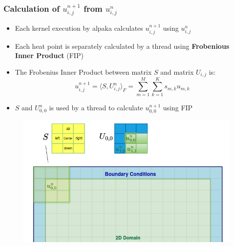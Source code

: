 \documentclass[9pt]{beamer}
\begin{document}
\begin{frame}
\frametitle{Calculation of $u_{i,j}^{n+1}$ from $u_{i,j}^{n}$}
\vspace{-0.1\baselineskip}
    \begin{itemize}
        \item Each kernel execution by alpaka calculates $u_{i,j}^{n+1}$ using $u_{i,j}^{n}$
        \item Each heat point is separately calculated by a thread using \textbf{Frobenious Inner Product} (FIP)
        \item The Frobenius Inner Product between matrix \( S \) and matrix \( U_{i,j} \) is:
\[
 u_{i,j}^{n+1} = \langle S, U^{n}_{i,j} \rangle_F = \sum_{m=1}^{M} \sum_{k=1}^{K} s_{m,k} u_{m,k}
\]
        \item $S$ and $U^{n}_{0,0}$ is used  by a thread to calculate $u_{0,0}^{n+1}$ using FIP
    \end{itemize}
    \begin{figure}
        \centering
            \includegraphics[width=0.75\linewidth, height=0.4\textheight]{Screenshot from 2024-09-22 00-16-53.png}
        \label{fig:enter-label}
    \end{figure}
\end{frame}
\end{document}
